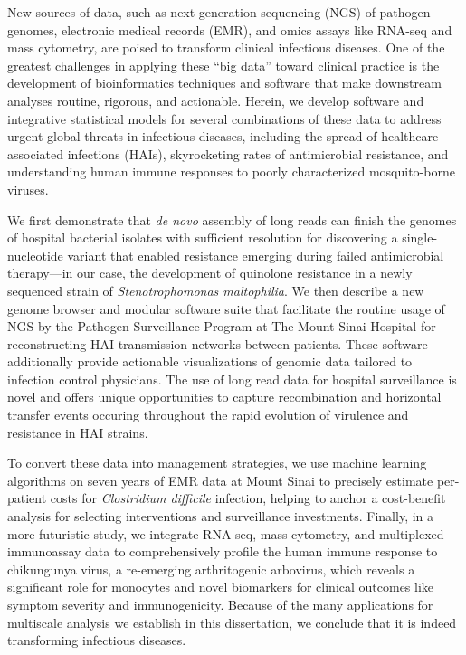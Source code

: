 
\noindent{}New sources of data, such as next generation sequencing (NGS) of pathogen ge\-nomes, electronic medical records (EMR), and omics assays like RNA-seq and mass cytometry, are poised to transform clinical infectious diseases. One of the greatest challenges in applying these ``big data'' toward clinical practice is the development of bioinformatics techniques and software that make downstream analyses routine, rigorous, and actionable. Herein, we develop software and integrative statistical models for several combinations of these data to address urgent global threats in infectious diseases, including the spread of healthcare associated infections (HAIs), skyrocketing rates of antimicrobial resistance, and understanding human immune responses to poorly characterized mosquito-borne viruses.

We first demonstrate that \emph{de novo} assembly of long reads can finish the genomes of hospital bacterial isolates with sufficient resolution for discovering a sin\-gle-\allowbreak nu\-cle\-o\-tide variant that enabled resistance emerging during failed antimicrobial therapy—in our case, the development of quinolone resistance in a newly sequenced strain of \emph{Stenotrophomonas maltophilia}. We then describe a new genome browser and modular software suite that facilitate the routine usage of NGS by the Pathogen Surveillance Program at The Mount Sinai Hospital for reconstructing HAI transmission networks between patients. These software additionally provide actionable visualizations of genomic data tailored to infection control physicians. The use of long read data for hospital surveillance is novel and offers unique opportunities to capture recombination and horizontal transfer events occuring throughout the rapid evolution of virulence and resistance in HAI strains. 

To convert these data into management strategies, we use machine learning algorithms on seven years of EMR data at Mount Sinai to precisely estimate per-patient costs for \emph{Clostridium difficile} infection, helping to anchor a cost-benefit analysis for selecting interventions and surveillance investments. Finally, in a more futuristic study, we integrate RNA-seq, mass cytometry, and multiplexed immunoassay data to comprehensively profile the human immune response to chikungunya virus, a re-emerging arthritogenic arbovirus, which reveals a significant role for monocytes and novel biomarkers for clinical outcomes like symptom severity and immunogenicity. Because of the many applications for multiscale analysis we establish in this dissertation, we conclude that it is indeed transforming infectious diseases.